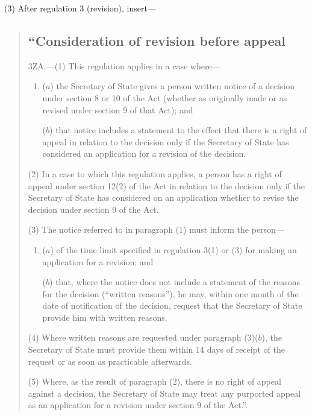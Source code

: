 \documentclass[12pt,a4paper]{article}
\begin{document}
(3) After regulation 3 (revision), insert—
\begin{quotation}
\subsection*{“Consideration of revision before appeal}

3ZA.---(1)  This regulation applies in a case where—
\begin{enumerate}\item[]
($a$) the Secretary of State gives a person written notice of a decision under section 8 or 10 of the Act (whether as originally made or as revised under section 9 of that Act); and

($b$) that notice includes a statement to the effect that there is a right of appeal in relation to the decision only if the Secretary of State has considered an application for a revision of the decision.
\end{enumerate}

(2) In a case to which this regulation applies, a person has a right of appeal under section 12(2) of the Act in relation to the decision only if the Secretary of State has considered on an application whether to revise the decision under section 9 of the Act.

(3) The notice referred to in paragraph (1) must inform the person—
\begin{enumerate}\item[]
($a$) of the time limit specified in regulation 3(1) or (3) for making an application for a revision; and

($b$) that, where the notice does not include a statement of the reasons for the decision (“written reasons”), he may, within one month of the date of notification of the decision, request that the Secretary of State provide him with written reasons.
\end{enumerate}

(4) Where written reasons are requested under paragraph (3)($b$), the Secretary of State must provide them within 14 days of receipt of the request or as soon as practicable afterwards.

(5) Where, as the result of paragraph (2), there is no right of appeal against a decision, the Secretary of State may treat any purported appeal as an application for a revision under section 9 of the Act.”.
\end{quotation}
\end{document}
